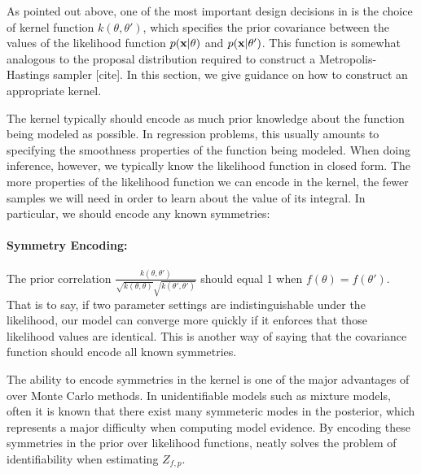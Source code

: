 As pointed out above, one of the most important design decisions in \bq{} is the choice of kernel function $k(\theta, \theta')$, which specifies the prior covariance between the values of the likelihood function $p({\bf{x}} | \theta)$ and $p({\bf{x}} | \theta')$.  This function is somewhat analogous to the proposal distribution required to construct a Metropolis-Hastings sampler [cite].  In this section, we give guidance on how to construct an appropriate kernel.

The kernel typically should encode as much prior knowledge about the function being modeled as possible.  In regression problems, this usually amounts to specifying the smoothness properties of the function being modeled.  When doing inference, however, we typically know the likelihood function in closed form.  The more properties of the likelihood function we can encode in the kernel, the fewer samples we will need in order to  learn about the value of its integral.  In particular, we should encode any known symmetries:

\paragraph{Symmetry Encoding:} \label{des:pcor1} The prior correlation $\frac{k(\theta, \theta')}{\sqrt{k(\theta, \theta)} \sqrt{k(\theta', \theta')}}$ should equal 1 when $f(\theta) = f(\theta')$. That is to say, if two parameter settings are indistinguishable under the likelihood, our model can converge more quickly if it enforces that those likelihood values are identical.  This is another way of saying that the covariance function should encode all known symmetries. %
%

The ability to encode symmetries in the kernel is one of the major advantages of \bq{} over Monte Carlo methods.  In unidentifiable models such as mixture models, often it is known that there exist many symmeteric modes in the posterior, which represents a major difficulty when computing model evidence.  By encoding these symmetries in the prior over likelihood functions, \bq{} neatly solves the problem of identifiability when estimating $Z_{f,p}$.


